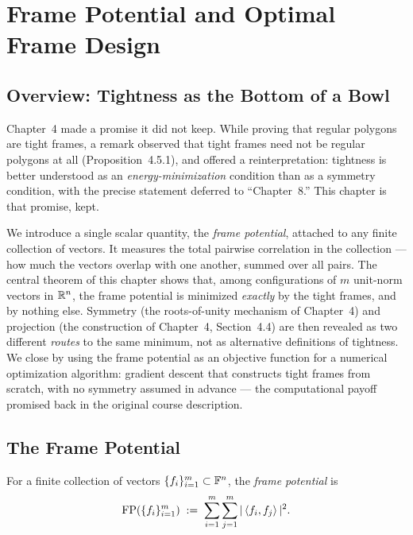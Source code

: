 \chapter{Frame Potential and Optimal Frame Design}
\label{ch:frame-potential}
\section{Overview: Tightness as the Bottom of a Bowl}
\label{sec:ch8-overview}

Chapter~4 made a promise it did not keep. While proving that regular
polygons are tight frames, a remark observed that tight frames need not
be regular polygons at all (Proposition~4.5.1), and offered a
reinterpretation: tightness is better understood as an
\emph{energy-minimization} condition than as a symmetry condition,
with the precise statement deferred to ``Chapter~8.'' This chapter is
that promise, kept.

We introduce a single scalar quantity, the \emph{frame potential},
attached to any finite collection of vectors. It measures the total
pairwise correlation in the collection --- how much the vectors overlap
with one another, summed over all pairs. The central theorem of this
chapter shows that, among configurations of $m$ unit-norm vectors in
$\mathbb{R}^n$, the frame potential is minimized \emph{exactly} by the tight
frames, and by nothing else. Symmetry (the roots-of-unity mechanism of
Chapter~4) and projection (the construction of Chapter~4, Section~4.4)
are then revealed as two different \emph{routes} to the same minimum,
not as alternative definitions of tightness. We close by using the
frame potential as an objective function for a numerical optimization
algorithm: gradient descent that constructs tight frames from scratch,
with no symmetry assumed in advance --- the computational payoff
promised back in the original course description.

\section{The Frame Potential}
\label{sec:fp-definition}

\begin{definition}
\label{def:frame-potential}
For a finite collection of vectors $\{f_i\}_{i=1}^m\subset\mathbb{F}^n$, the
\emph{frame potential} is
\[
  \operatorname{FP}(\{f_i\}_{i=1}^m) \;:=\; \sum_{i=1}^m\sum_{j=1}^m |\left\langle f_i, f_j \right\rangle|^2.
\]
\end{definition}

